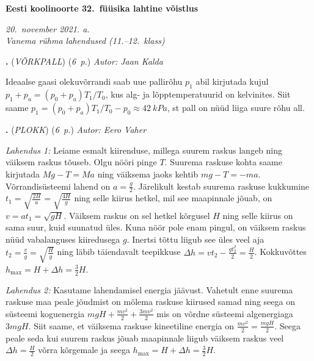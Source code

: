 \documentclass[11pt,a5paper]{article}
\newcommand{\numb}[1]{\vspace{5pt}\textbf{\large #1}}
\newcommand{\nimi}[1]{(\textsl{\small #1})}
\newcommand{\punktid}[1]{(\emph{#1~p.})}
\newcounter{ylesanne}
\newcommand{\yl}[1]{\addtocounter{ylesanne}{1}\numb{\theylesanne.} \nimi{#1} \newblock{}}
\newcommand{\autor}[1]{\emph{ Autor: #1}}%
\begin{document}
\begin{center}
  \textbf{\Large Eesti koolinoorte 32.\ füüsika lahtine võistlus} \par
  \emph{20.\ november 2021. a.\\Vanema rühma lahendused (11.--12.\ klass)}
\end{center}


\yl{VÕRKPALL}
\punktid{6} \autor{Jaan Kalda}

Ideaalse gaasi olekuvõrrandi saab uue pallirõhu $p_1$ abil kirjutada kujul $p_1+p_a=(p_0+p_a)T_1/T_0$, kus alg- ja lõpptemperatuurid on kelvinites. Siit saame $p_1=(p_0+p_a)T_1/T_0-p_0\approx \SI{42}{kPa}$, st pall on nüüd liiga suure rõhu all.

\yl{PLOKK}
\punktid{6} \autor{Eero Vaher}

\emph{Lahendus 1:} Leiame esmalt kiirenduse, millega suurem raskus langeb ning väiksem raskus tõuseb. Olgu nööri pinge $T$. Suurema raskuse kohta saame kirjutada $Mg-T=Ma$ ning väiksema jaoks kehtib $mg-T=-ma$. Võrrandisüsteemi lahend on $a=\frac{g}{2}$. Järelikult kestab suurema raskuse kukkumine $t_1=\sqrt{\frac{2H}{a}}=\sqrt{\frac{4H}{g}}$ ning selle kiirus hetkel, mil see maapinnale jõuab, on $v=at_1=\sqrt{gH}$. Väiksem raskus on sel hetkel kõrgusel $H$ ning selle kiirus on sama suur, kuid suunatud üles. Kuna nöör pole enam pingul, on väiksem raskus nüüd vabalanguses kiiredusega $g$. Inertsi tõttu liigub see üles veel aja $t_2=\frac{v}{g}=\sqrt{\frac{H}{g}}$ ning läbib täiendavalt teepikkuse $\Delta h=vt_2-\frac{gt^2_2}{2}=\frac{H}{2}$. Kokkuvõttes $h_\text{max}=H+\Delta h=\frac{3}{2}H$.

\emph{Lahendus 2:} Kasutame lahendamisel energia jäävust. Vahetult enne suurema raskuse maa peale jõudmist on mõlema raskuse kiirused samad ning seega on süsteemi koguenergia $mgH+\frac{mv^2}{2}+\frac{3mv^2}{2}$ mis on võrdne süsteemi algenergiaga $3mgH$. Siit saame, et väiksema raskuse kineetiline energia on $\frac{mv^2}{2}=\frac{mgH}{2}$. Seega peale seda kui suurem raskus jõuab maapinnale liigub väiksem raskus veel $\Delta h = \frac{H}{2}$ võrra kõrgemale ja seega $h_\text{max}=H+\Delta h=\frac{3}{2}H$.
\end{document}
